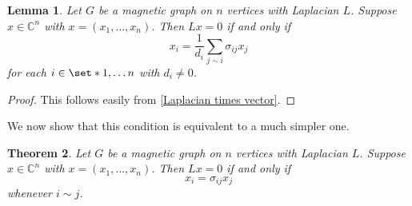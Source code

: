 \documentclass[12pt]{article}
\newtheorem{thm}{Theorem}
\newtheorem{lem}[thm]{Lemma}
\theoremstyle{definition}
\newcommand{\C}{\mathbb C}
\begin{document}
\begin{lem}\label{entries of vector in Laplacian's null space are signature-weighted averages}
Let $G$ be a magnetic graph on $n$ vertices with Laplacian $L$. Suppose $x \in \C^n$ with $x = (x_1, \dots, x_n)$. Then $Lx = 0$ if and only if
$$x_i = \frac{1}{d_i} \sum_{j \sim i} \sigma_{ij}x_j$$
for each $i \in \set*{1, \dots n}$ with $d_i \neq 0$.
\end{lem}
\begin{proof}
This follows easily from \cref{Laplacian times vector}.
\end{proof}

We now show that this condition is equivalent to a much simpler one.

\begin{thm}\label{characterization of null space of Laplacian}
Let $G$ be a magnetic graph on $n$ vertices with Laplacian $L$. Suppose $x \in \C^n$ with $x = (x_1, \dots, x_n)$. Then $Lx = 0$ if and only if
$$x_i = \sigma_{ij}x_j$$
whenever $i \sim j$.
\end{thm}
\end{document}

